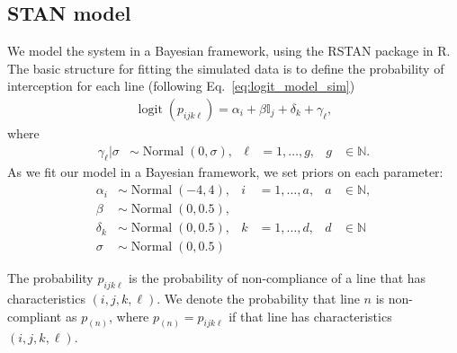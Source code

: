 \documentclass{article}
\DeclareMathOperator{\logit}{logit}
\DeclareMathOperator{\Normal}{Normal}
\begin{document}
\subsection{STAN model}
We model the system in a Bayesian framework, using the RSTAN package in R. The basic structure for fitting the simulated data is to define the probability of interception for each line (following Eq.~\eqref{eq:logit_model_sim})
\begin{align}
\logit(p_{ijk\ell}) = \alpha_{i} + \beta\mathbb{I}_j + \delta_k + \gamma_\ell, \label{eq:logit_model_fit_sim}
\end{align}
where 
\begin{align}
\gamma_\ell | \sigma &\sim \Normal(0, \sigma), & \ell &= 1,\ldots, g, & g&\in \mathbb{N}.
\end{align}
As we fit our model in a Bayesian framework, we set priors on each parameter:
\begin{align}
\alpha_i &\sim \Normal(-4, 4), & i&=1, \ldots, a, & a&\in \mathbb{N},\\
\beta &\sim \Normal(0, 0.5),\\
\delta_k &\sim \Normal(0, 0.5), & k &= 1,\ldots, d, & d &\in \mathbb{N}\\
\sigma &\sim \Normal(0, 0.5)
\end{align}

The probability $p_{ijk\ell}$ is the probability of non-compliance of a line that has characteristics $(i,j,k,\ell)$. We denote the probability that line $n$ is non-compliant as $p_{(n)}$, where $p_{(n)} = p_{ijk\ell}$ if that line has characteristics $(i,j,k,\ell)$.
\end{document}

